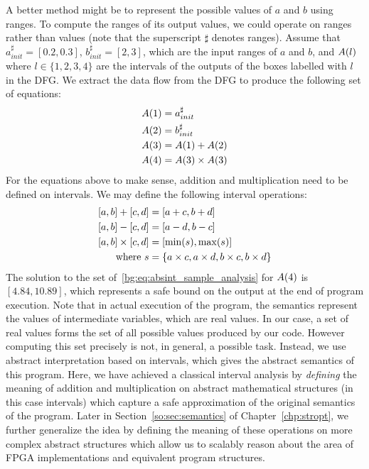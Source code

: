 A better method might be to represent the possible values of $a$ and $b$ using
ranges. To compute the ranges of its output values, we could operate on ranges
rather than values (note that the superscript $\sharp$ denotes ranges). Assume
that $a^\sharp_{init} = [0.2, 0.3]$, $b^\sharp_{init} = [2, 3]$, which are the
input ranges of $a$ and $b$, and $A({l})$ where $l \in \{1, 2, 3, 4\}$ are
the intervals of the outputs of the boxes labelled with $l$ in the DFG\@. We
extract the data flow from the DFG to produce the following set of equations:
\begin{equation}
    \begin{aligned}
        A({1}) &= a^\sharp_{init} \\
        A({2}) &= b^\sharp_{init} \\
        A({3}) &= A({1}) + A({2}) \\
        A({4}) &= A({3}) \times A({3})
    \end{aligned}
    \label{bg:eq:absint_sample_analysis}
\end{equation}
For the equations above to make sense, addition and multiplication need to be
defined on intervals. We may define the following interval operations:
\begin{equation}
    \begin{aligned}
        \left[{a}, {b}\right] + \left[{c}, {d}\right] &= \left[{a + c}, {b + d}\right] \\
        \left[{a}, {b}\right] - \left[{c}, {d}\right] &=  \left[{a - d}, {b - c}\right] \\
        \left[{a}, {b}\right] \times \left[{c}, {d}\right] &=
            \left[{\min(s)}, {\max(s)}\right] \\
        \text{where~} s &= \{ a \times c, a \times d, b \times c, b \times d \}
    \end{aligned}
    \label{bg:eq:interval_operations}
\end{equation}
The solution to the set of~\eqref{bg:eq:absint_sample_analysis} for $A({4})$
is $[4.84, 10.89]$, which represents a safe bound on the output at the end
of program execution. Note that in actual execution of the program, the
semantics represent the values of intermediate variables, which are real
values. In our case, a set of real values forms the set of all possible
values produced by our code. However computing this set precisely is not,
in general, a possible task. Instead, we use abstract interpretation based
on intervals, which gives the abstract semantics of this program. Here, we
have achieved a classical interval analysis by \emph{defining} the meaning of
addition and multiplication on abstract mathematical structures (in this case
intervals) which capture a safe approximation of the original semantics of the
program. Later in Section~\ref{so:sec:semantics} of Chapter~\ref{chp:stropt},
we further generalize the idea by defining the meaning of these operations on
more complex abstract structures which allow us to scalably reason about the
area of FPGA implementations and equivalent program structures.


